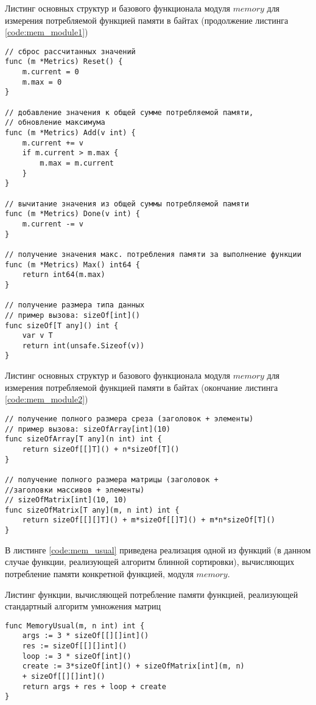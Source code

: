 \begin{code}
\caption{Листинг основных структур и базового функционала модуля $memory$ для измерения потребляемой функцией памяти в байтах (продолжение листинга \ref{code:mem_module1})}
\label{code:mem_module2}

\begin{verbatim}
// сброс рассчитанных значений
func (m *Metrics) Reset() {
	m.current = 0
	m.max = 0
}

// добавление значения к общей сумме потребляемой памяти,
// обновление максимума
func (m *Metrics) Add(v int) {
	m.current += v
	if m.current > m.max {
		m.max = m.current
	}
}

// вычитание значения из общей суммы потребляемой памяти
func (m *Metrics) Done(v int) {
	m.current -= v
}

// получение значения макс. потребления памяти за выполнение функции
func (m *Metrics) Max() int64 {
	return int64(m.max)
}

// получение размера типа данных
// пример вызова: sizeOf[int]()
func sizeOf[T any]() int {
	var v T
	return int(unsafe.Sizeof(v))
}
\end{verbatim}
\end{code}

\begin{code}
\caption{Листинг основных структур и базового функционала модуля $memory$ для измерения потребляемой функцией памяти в байтах (окончание листинга \ref{code:mem_module2})}
\label{code:mem_module3}

\begin{verbatim}
// получение полного размера среза (заголовок + элементы)
// пример вызова: sizeOfArray[int](10)
func sizeOfArray[T any](n int) int {
	return sizeOf[[]T]() + n*sizeOf[T]()
}

// получение полного размера матрицы (заголовок + 
//заголовки массивов + элементы)
// sizeOfMatrix[int](10, 10)
func sizeOfMatrix[T any](m, n int) int {
	return sizeOf[[][]T]() + m*sizeOf[[]T]() + m*n*sizeOf[T]()
}
\end{verbatim}
\end{code}

В листинге \ref{code:mem_usual} приведена реализация одной из функций (в данном случае функции, реализующей алгоритм блинной сортировки), вычисляющих потребление памяти конкретной функцией, модуля $memory$.

\begin{code}
\caption{Листинг функции, вычисляющей потребление памяти функцией, реализующей стандартный алгоритм умножения матриц}
\label{code:mem_usual}

\begin{verbatim}
func MemoryUsual(m, n int) int {
	args := 3 * sizeOf[[][]int]()
	res := sizeOf[[][]int]()
	loop := 3 * sizeOf[int]()
	create := 3*sizeOf[int]() + sizeOfMatrix[int](m, n) 
	+ sizeOf[[][]int]()
	return args + res + loop + create
}
\end{verbatim}
\end{code}

